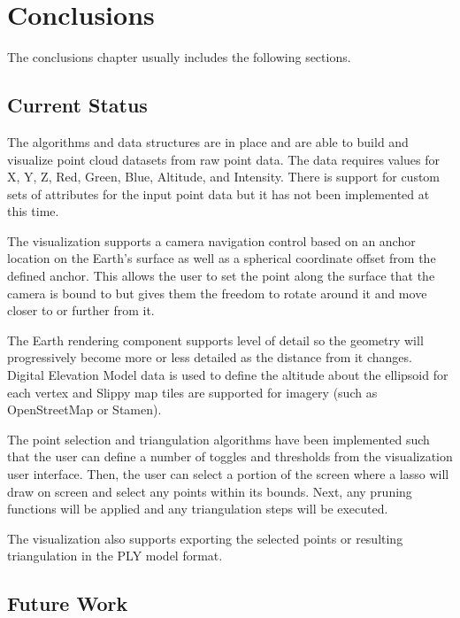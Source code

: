 \chapter{Conclusions}


The conclusions chapter usually includes the following sections.



\section{Current Status}

The algorithms and data structures are in place and are able to build and
visualize point cloud datasets from raw point data. The data requires values for
X, Y, Z, Red, Green, Blue, Altitude, and Intensity. There is support for custom
sets of attributes for the input point data but it has not been implemented at
this time.

The visualization supports a camera navigation control based on an anchor
location on the Earth's surface as well as a spherical coordinate offset from
the defined anchor. This allows the user to set the point along the surface that
the camera is bound to but gives them the freedom to rotate around it and move
closer to or further from it.

The Earth rendering component supports level of detail so the geometry will
progressively become more or less detailed as the distance from it changes.
Digital Elevation Model data is used to define the altitude about the ellipsoid
for each vertex and Slippy map tiles are supported for imagery (such as
OpenStreetMap or Stamen).

The point selection and triangulation algorithms have been implemented such that
the user can define a number of toggles and thresholds from the visualization
user interface. Then, the user can select a portion of the screen where a lasso
will draw on screen and select any points within its bounds. Next, any pruning
functions will be applied and any triangulation steps will be executed.

The visualization also supports exporting the selected points or resulting
triangulation in the PLY model format.

\section{Future Work}

